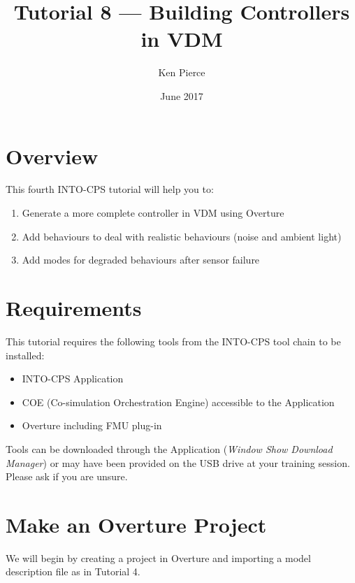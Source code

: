 \documentclass[11pt,a4paper]{../tutorial}
\title{Tutorial 8 --- Building Controllers in VDM}
\date{June 2017}
\author{Ken Pierce}
\begin{document}
\section*{Overview}

This fourth INTO-CPS tutorial will help you to:

\begin{enumerate}[noitemsep]
\item Generate a more complete controller in VDM using Overture
\item Add behaviours to deal with realistic behaviours (noise and ambient light)
\item Add modes for degraded behaviours after sensor failure
\end{enumerate}

\section*{Requirements}

This tutorial requires the following tools from the INTO-CPS tool chain to be installed:

\begin{itemize}[noitemsep]
\item INTO-CPS Application
\item COE (Co-simulation Orchestration Engine) accessible to the Application
\item Overture including FMU plug-in
\end{itemize}

Tools can be downloaded through the Application (\emph{Window \menusep Show Download Manager}) or may have been provided on the USB drive at your training session. Please ask if you are unsure.

\section{Make an Overture Project}

We will begin by creating a project in Overture and importing a model description file as in Tutorial 4.
\end{document}
